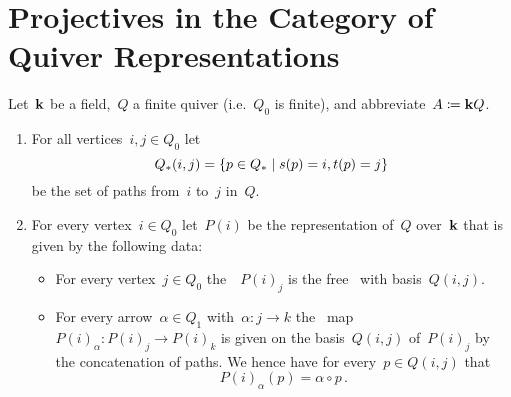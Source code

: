 \section{Projectives in the Category of Quiver Representations}


\begin{conventionnonum}
  Let~$\mathbf{k}$ be a field,~$Q$ a finite quiver (i.e.~$Q_0$ is finite), and abbreviate~$A \coloneqq \mathbf{k} Q$.
\end{conventionnonum}


\begin{definition}
  \leavevmode
  \begin{enumerate}
    \item
      For all vertices~$i, j \in Q_0$ let
      \[
        Q_*(i,j)
        =
        \{
          p \in Q_*
        \suchthat
          s(p) = i,
          t(p) = j
        \}
      \]
      be the set of paths from~$i$ to~$j$ in~$Q$.
    \item
      For every vertex~$i \in Q_0$ let~$P(i)$ be the representation of~$Q$ over~$\mathbf{k}$ that is given by the following data:
      \begin{itemize}
        \item
          For every vertex~$j \in Q_0$ the~{\kvs}~$P(i)_j$ is the free~{\kvs} with basis~$Q(i,j)$.
        \item
          For every arrow~$\alpha \in Q_1$ with~$\alpha \colon j \to k$ the~{\klin} map~$P(i)_\alpha \colon P(i)_j \to P(i)_k$ is given on the basis~$Q(i,j)$ of~$P(i)_j$ by the concatenation of paths.
          We hence have for every~$p \in Q(i,j)$ that
          \[
            P(i)_\alpha(p)
            =
            \alpha \circ p  \,.
          \]
      \end{itemize}
  \end{enumerate}
\end{definition}


